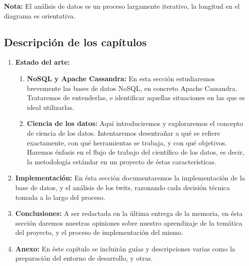\begin{center}
  \textbf{Nota: } El análisis de datos es un proceso largamente iterativo, la
  longitud en el diagrama es orientativa.
\end{center}

\vspace{1cm}
\hspace*{-1.3in}

\subsection{Descripción de los capítulos}
\label{subsec:chaps}

\begin{enumerate}
  \item \textbf{Estado del arte: }
    \begin{enumerate}
      \item \textbf{NoSQL y Apache Cassandra: } En esta sección estudiaremos
        brevemente las bases de datos NoSQL, en concreto Apache Cassandra.
        Trataremos de entenderlas, e identificar aquellas situaciones en las que
        es ideal utilizarlas.
      \item \textbf{Ciencia de los datos: } Aquí introduciremos y exploraremos el
        concepto de ciencia de los datos. Intentaremos desentrañar a qué se refiere
        exactamente, con qué herramientas se trabaja, y con qué objetivos.
        Haremos énfasis en el flujo de trabajo del científico de los datos, es
        decir, la metodología estándar en un proyecto de éstas características.
    \end{enumerate}

  \item \textbf{Implementación: } En ésta sección documentaremos
    la implementación de la base de datos, y el análisis de los twits, razonando
    cada decisión técnica tomada a lo largo del proceso.
  \item \textbf{Conclusiones: } A ser redactada en la última entrega de la
    memoria, en ésta sección daremos nuestras opiniones sobre nuestro
    aprendizaje de la temática del proyecto, y el proceso de implementación del mismo.
  \item \textbf{Anexo: } En éste capítulo se incluirán guías y descripciones
    varias como la preparación del entorno de desarrollo, y otras.
\end{enumerate}


